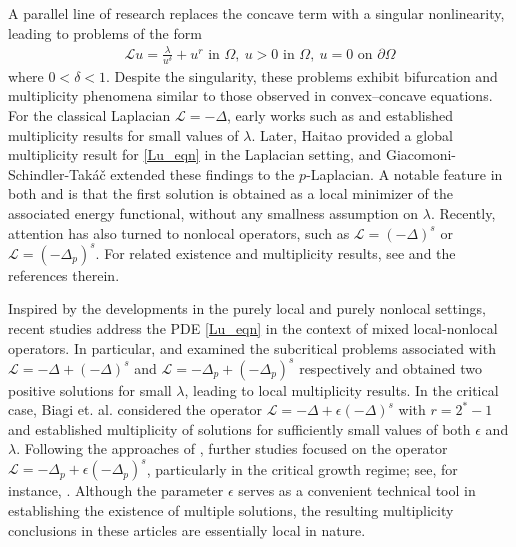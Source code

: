 \documentclass[reqno,oneside]{amsart}
\theoremstyle{definition}
\theoremstyle{remark}
\numberwithin{equation}{section}
\newcommand{\Om} {\Omega}
\newcommand{\De} {\Delta}
\newcommand{\s}{(-\Delta)^s}
\newcommand{\ps}{(-\Delta_p)^s}
\newcommand{\la} {\lambda}
\begin{document}
A parallel line of research replaces the concave term with a singular nonlinearity, leading to problems of the form
\begin{align}\label{Lu_eqn}
    \mathcal{L} u = \frac{\la}{u^{\delta}} + u^r \text{ in } \Om,\ u>0 \text{ in } \Om,\ u=0 \text{ on } \partial \Omega
\end{align}
where $0<\delta<1$. Despite the singularity, these problems exhibit bifurcation and multiplicity phenomena similar to those observed in convex–concave equations. For the classical Laplacian $\mathcal{L}=-\Delta$, early works such as \cite{coclite1989singular, yijing2001subcritical} and \cite{hirano2004critical} established multiplicity results for small values of $\la$. Later, Haitao \cite{haitao2003multiplicity} provided a global multiplicity result for \eqref{Lu_eqn} in the Laplacian setting, and Giacomoni-Schindler-Tak\'a\v{c} \cite{giacomoni2007sobolev} extended these findings to the $p$-Laplacian. A notable feature in both \cite{haitao2003multiplicity} and \cite{giacomoni2007sobolev} is that the first solution is obtained as a local minimizer of the associated energy functional, without any smallness assumption on $\la$. Recently, attention has also turned to nonlocal operators, such as $\mathcal{L}=\s$ or $\mathcal{L}=\ps$. For related existence and multiplicity results, see \cite{barrios2015multiplicity, giacomoni2019verysingular, adimurthi2018fractional, tuhina2019nehari} and the references therein.

Inspired by the developments in the purely local and purely nonlocal settings, recent studies address the PDE \eqref{Lu_eqn} in the context of mixed local-nonlocal operators. In particular, \cite{garain2023subcritical} and \cite{bal2024multiplicitysolutionsmixedlocalnonlocal} examined the subcritical problems associated with $\mathcal{L}= -\De + \s$ and $\mathcal{L}= -\De_p + \ps$ respectively and obtained two positive solutions for small $\la$, leading to local multiplicity results. In the critical case, Biagi et. al. \cite{biagi2024critical} considered the operator $\mathcal{L}= -\De + \epsilon \s$ with $r= 2^* -1$ and established multiplicity of solutions for sufficiently small values of both $\epsilon$ and $\la$. Following the approaches of \cite{ biagi2024critical, biagi2025convexconcave}, further studies focused on the operator $\mathcal{L}=-\De_p +\epsilon \ps$, particularly in the critical growth regime; see, for instance, \cite{bhakta2025quasilinearproblemsmixedlocalnonlocal, sanjit2025multiplicity}. Although the parameter $\epsilon$ serves as a convenient technical tool in establishing the existence of multiple solutions, the resulting multiplicity conclusions in these articles are essentially local in nature. 
\end{document}
